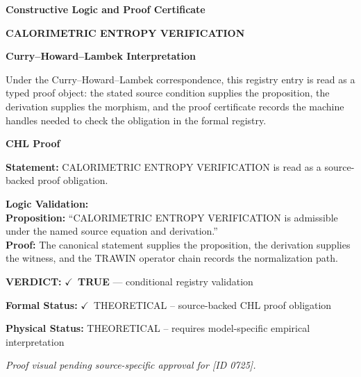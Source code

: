 \clearpage
\begingroup\tzpsupportsetup
\noindent\textbf{\fontsize{10.8pt}{12.8pt}\selectfont [ID 0725] Constructive Logic and Proof Certificate}\par
\noindent\textbf{\fontsize{10pt}{12pt}\selectfont CALORIMETRIC ENTROPY VERIFICATION}\par
\vspace{0.45em}
\begingroup
\footnotesize
\setlength{\parskip}{0.22em}
\setlength{\parindent}{0pt}
\noindent\textbf{Curry--Howard--Lambek Interpretation}\par
Under the Curry--Howard--Lambek correspondence, this registry entry is read as a typed proof
object: the stated source condition supplies the proposition, the derivation supplies the
morphism, and the proof certificate records the machine handles needed to check the obligation
in the formal registry.

\vspace{0.45em}
\noindent\textbf{CHL Proof}\par
\textbf{Statement:} CALORIMETRIC ENTROPY VERIFICATION is read as a source-backed proof obligation.

\textbf{Logic Validation:}\\
\textbf{Proposition:} ``CALORIMETRIC ENTROPY VERIFICATION is admissible under the named source equation and derivation.''\\
\textbf{Proof:} The canonical statement supplies the proposition, the derivation supplies the witness, and the TRAWIN operator chain records the normalization path.

\textbf{VERDICT:} \ensuremath{\checkmark}\ \textbf{TRUE} --- conditional registry validation

\textbf{Formal Status:} \ensuremath{\checkmark}\ THEORETICAL -- source-backed CHL proof obligation

\textbf{Physical Status:} THEORETICAL -- requires model-specific empirical interpretation
\par\vspace{0.45em}
\par
\vfill
\begingroup\footnotesize\itshape
Proof visual pending source-specific approval for [ID 0725].
\par\endgroup
\vfill
\endgroup
\endgroup
